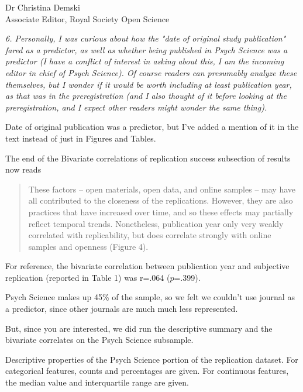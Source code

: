 \documentclass{stanfordletter}
\newcommand{\theysaid}[1]{\begin{leftbar} \noindent 
		\textsl{ #1}\end{leftbar}}
\newcommand{\revised}[1]{\begin{quote}	#1 \end{quote}}
\begin{document}
\begin{letter}{Dr Christina Demski \\ Associate Editor, Royal Society Open Science}
          \theysaid{
          	6. Personally, I was curious about how the "date of original study publication" fared as a predictor, as well as whether being published in Psych Science was a predictor (I have a conflict of interest in asking about this, I am the incoming editor in chief of Psych Science).  Of course readers can presumably analyze these themselves, but I wonder if it would be worth including at least publication year, as that was in the preregistration (and I also thought of it before looking at the preregistration, and I expect other readers might wonder the same thing).
          }
          
          Date of original publication was a predictor, but I've added a mention of it in the text instead of just in Figures and Tables. 
       
          The end of the Bivariate correlations of replication success subsection of results now reads
          
          \revised{These factors -- open materials, open data, and online samples --  may have all contributed to the closeness of the replications. However, they are also practices that have increased over time, and so these effects may partially reflect temporal trends. Nonetheless, publication year only very weakly correlated with replicability, but does correlate strongly with online samples and openness (Figure 4).}
          
          For reference, the bivariate correlation between publication year and subjective replication (reported in Table 1) was r=.064 ($p$=.399). 
          	

          
          Psych Science makes up 45\% of the sample, so we felt we couldn't use journal as a predictor, since other journals are much much less represented. 
          
          But, since you are interested, we did run the descriptive summary and the bivariate correlates on the Psych Science subsample. 
          
           
          
\begin{center}
          
          Descriptive properties of the Psych Science portion of the replication dataset. For categorical features, counts and percentages are given. For continuous features, the median value and interquartile range are given. 


\end{center}
\end{letter}
\end{document}
